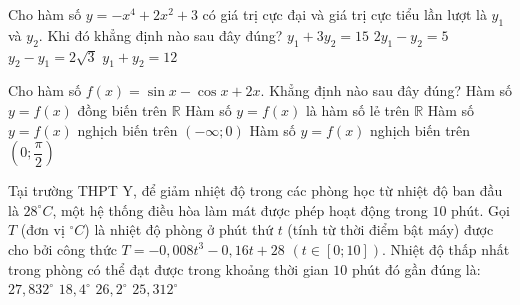 \begin{ex}%
	Cho hàm số $y=-x^4+2x^2+3$ có giá trị cực đại và giá trị cực tiểu lần lượt là $y_1$ và $y_2$. Khi đó khẳng định nào sau đây đúng?
	\choice
	{$y_1+3y_2=15$}
	{\True $2y_1-y_2=5$}
	{$y_2-y_1=2\sqrt{3}$}
	{$y_1+y_2=12$}
\end{ex} 

\begin{ex}%
	Cho hàm số $f(x)=\sin x-\cos x+2x$. Khẳng định nào sau đây đúng?
	\haicot
	{\True Hàm số $y=f(x)$ đồng biến trên $\mathbb{R}$}
	{Hàm số $y=f(x)$ là hàm số lẻ trên $\mathbb{R}$}
	{Hàm số $y=f(x)$ nghịch biến trên $(-\infty;0)$}
	{Hàm số $y=f(x)$ nghịch biến trên $\left(0; \dfrac{\pi}{2}\right)$}
\end{ex} 

\begin{ex}%
	Tại trường THPT Y, để giảm nhiệt độ trong các phòng học từ nhiệt độ ban đầu là $28^\circ C$, một hệ thống điều hòa làm mát được phép hoạt động trong $10$ phút. Gọi $T$ (đơn vị $^\circ C$) là nhiệt độ phòng ở phút thứ $t$ (tính từ thời điểm bật máy) được cho bởi công thức $T=-0,008t^3-0,16t+28$ $\left(t \in \left[0;10\right]\right)$. Nhiệt độ thấp nhất trong phòng có thể đạt được trong khoảng thời gian $10$ phút đó gần đúng là:
	\choice
	{$27,832^\circ$}
	{\True $18,4^\circ$}
	{$26,2^\circ$}
	{$25,312^\circ$}
\end{ex}

